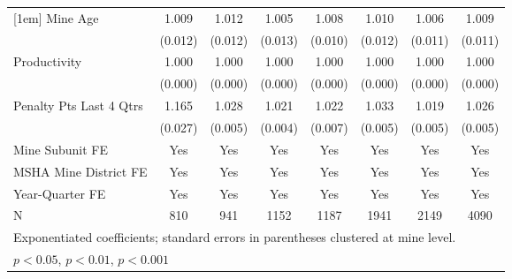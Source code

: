 {\begin{tabular}{l*{7}{c}}
[1em]
Mine Age                 &       1.009         &       1.012         &       1.005         &       1.008         &       1.010         &       1.006         &       1.009         \\
                         &     (0.012)         &     (0.012)         &     (0.013)         &     (0.010)         &     (0.012)         &     (0.011)         &     (0.011)         \\
[1em]
Productivity             &       1.000         &       1.000         &       1.000         &       1.000         &       1.000         &       1.000         &       1.000         \\
                         &     (0.000)         &     (0.000)         &     (0.000)         &     (0.000)         &     (0.000)         &     (0.000)         &     (0.000)         \\
[1em]
Penalty Pts Last 4 Qtrs  &       1.165\sym{***}&       1.028\sym{***}&       1.021\sym{***}&       1.022\sym{**} &       1.033\sym{***}&       1.019\sym{***}&       1.026\sym{***}\\
                         &     (0.027)         &     (0.005)         &     (0.004)         &     (0.007)         &     (0.005)         &     (0.005)         &     (0.005)         \\
[1em]
Mine Subunit FE          &         Yes         &         Yes         &         Yes         &         Yes         &         Yes         &         Yes         &         Yes         \\
[1em]
MSHA Mine District FE    &         Yes         &         Yes         &         Yes         &         Yes         &         Yes         &         Yes         &         Yes         \\
[1em]
Year-Quarter FE          &         Yes         &         Yes         &         Yes         &         Yes         &         Yes         &         Yes         &         Yes         \\
\hline
N                        &         810         &         941         &        1152         &        1187         &        1941         &        2149         &        4090         \\
\hline\hline
\multicolumn{8}{l}{\footnotesize Exponentiated coefficients; standard errors in parentheses clustered at mine level.}\\
\multicolumn{8}{l}{\footnotesize \sym{*} \(p<0.05\), \sym{**} \(p<0.01\), \sym{***} \(p<0.001\)}\\
\end{tabular}
}
